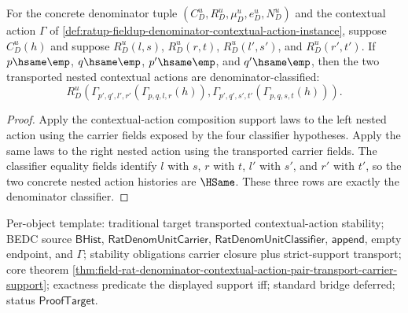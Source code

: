 \begin{theorem}
\label{thm:rat-denom-unit-contextual-action-pair-transport-classifier}
For the concrete denominator tuple
$(C_D^u,R_D^u,\mu_D^u,e_D^u,N_D^u)$ and the contextual action $\Gamma$ of
\autoref{def:ratup-fieldup-denominator-contextual-action-instance}, suppose
$C_D^u(h)$ and suppose
$R_D^u(l,s)$, $R_D^u(r,t)$, $R_D^u(l',s')$, and $R_D^u(r',t')$. If
$p\hsame\emp$, $q\hsame\emp$, $p'\hsame\emp$, and $q'\hsame\emp$, then the
two transported nested contextual actions are denominator-classified:
$$
R_D^u(\Gamma_{p',q',l',r'}(\Gamma_{p,q,l,r}(h)),
\Gamma_{p',q',s',t'}(\Gamma_{p,q,s,t}(h))).
$$
\end{theorem}
\begin{proof}
Apply the contextual-action composition support laws to the left nested action
using the carrier fields exposed by the four classifier hypotheses. Apply the
same laws to the right nested action using the transported carrier fields. The
classifier equality fields identify $l$ with $s$, $r$ with $t$, $l'$ with
$s'$, and $r'$ with $t'$, so the two concrete nested action histories are
$\HSame$. These three rows are exactly the denominator classifier.
\end{proof}

Per-object template: traditional target transported contextual-action
stability; BEDC source $\mathsf{BHist}$, $\mathsf{RatDenomUnitCarrier}$,
$\mathsf{RatDenomUnitClassifier}$, $\mathsf{append}$, empty endpoint, and
$\Gamma$; stability obligations carrier closure plus strict-support transport;
core theorem
\autoref{thm:field-rat-denominator-contextual-action-pair-transport-carrier-support};
exactness predicate the displayed support iff; standard bridge deferred; status
$\mathsf{ProofTarget}$.

